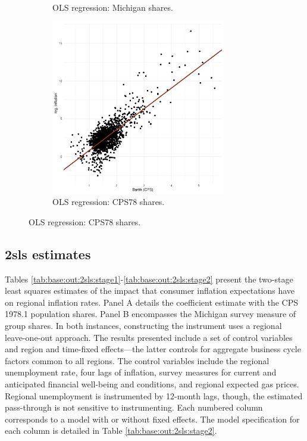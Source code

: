 \documentclass[12pt]{article}
\begin{document}
\begin{figure}
\begin{subfigure}[t]{0.475\textwidth}
%
\caption{OLS regression: Michigan shares.}\label{subfig:redform:stage2:michigan}
\end{subfigure}
\begin{subfigure}[t]{0.475\textwidth}
\centering
\includegraphics[width =3in, height =3in]{figs/redform_cps}
%
\caption{OLS regression: CPS78 shares.}\label{subfig:redform:stage2:cps}
\end{subfigure}
\end{figure}


\subsection{2sls estimates}\label{mainEstimates}



Tables \ref{tab:base:out:2sls:stage1}-\ref{tab:base:out:2sls:stage2} present the two-stage least squares estimates of the impact that consumer inflation expectations have on regional inflation rates. Panel A details the coefficient estimate with the CPS 1978.1 population shares.  Panel B encompasses the Michigan survey measure of group shares. In both instances, constructing the instrument uses a regional leave-one-out approach. The results presented include a set of control variables and region and time-fixed effects—the latter controls for aggregate business cycle factors common to all regions. The control variables include the regional unemployment rate, four lags of inflation, survey measures for current and anticipated financial well-being and conditions, and regional expected gas prices.  Regional unemployment is instrumented by 12-month lags, though, the estimated pass-through is not sensitive to instrumenting.  Each numbered column corresponds to a model with or without fixed effects.  The model specification for each column is detailed in Table \ref{tab:base:out:2sls:stage2}.
\end{document}
